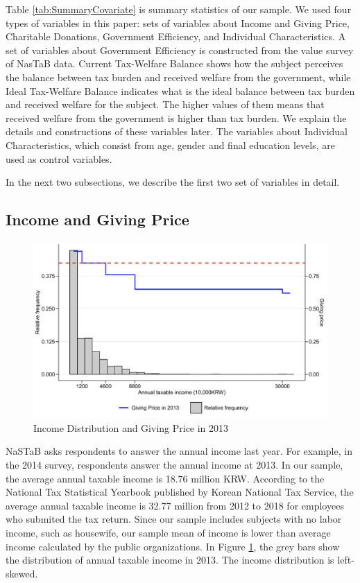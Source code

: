\documentclass[
  11pt,
  a4paper,
]{article}
\begin{document}
  Table \ref{tab:SummaryCovariate} is summary statistics of our sample.
  We used four types of variables in this paper:
  sets of variables about Income and Giving Price,
  Charitable Donations,
  Government Efficiency,
  and Individual Characteristics.
  A set of variables about Government Efficiency is constructed from the value survey of NasTaB data.
  Current Tax-Welfare Balance shows how the subject perceives the balance between tax burden and received welfare from the government,
  while Ideal Tax-Welfare Balance indicates what is the ideal balance between tax burden and received welfare for the subject.
  The higher values of them means that received welfare from the government is higher than tax burden.
  We explain the details and constructions of these variables later.
  The variables about Individual Characteristics,
  which consist from age, gender and final education levels, are used as control variables.

  In the next two subsections,
  we describe the first two set of variables in detail.

  \hypertarget{income-and-giving-price}{%
  \subsection{Income and Giving Price}\label{income-and-giving-price}}

  \begin{figure}[t]

  {\centering \includegraphics[width=0.9\linewidth]{draft_files/figure-latex/SummaryPriceChange-1} 

  }

  \caption{Income Distribution and Giving Price in 2013}\label{fig:SummaryPriceChange}
  \end{figure}

  NaSTaB asks respondents to answer the annual income last year.
  For example, in the 2014 survey, respondents answer the annual income at 2013.
  In our sample, the average annual taxable income is 18.76 million KRW.
  According to the National Tax Statistical Yearbook published by Korean National Tax Service,
  the average annual taxable income is 32.77 million from 2012 to 2018
  for employees who submited the tax return.
  Since our sample includes subjects with no labor income, such as housewife,
  our sample mean of income is lower than average income calculated by the public organizations.
  In Figure \ref{fig:SummaryPriceChange},
  the grey bars show the distribution of annual taxable income in 2013.
  The income distribution is left-skewed.
\end{document}
